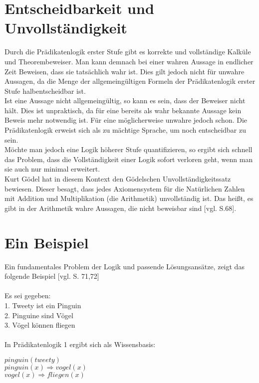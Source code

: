 \section{Entscheidbarkeit und Unvollständigkeit}
Durch die Prädikatenlogik erster Stufe gibt es korrekte und vollständige
Kalküle und Theorembeweiser. Man kann demnach bei einer wahren Aussage in endlicher Zeit Beweisen, dass sie tatsächlich wahr ist. Dies gilt jedoch nicht für unwahre Aussagen, da die Menge der allgemeingültigen Formeln der Prädikatenlogik erster Stufe halbentscheidbar ist.\\
Ist eine Aussage nicht allgemeingültig, so kann es sein, dass der Beweiser nicht hält. Dies ist unpraktisch, da für eine bereits als wahr bekannte Aussage kein Beweis mehr notwendig ist. Für eine möglicherweise unwahre jedoch schon.
Die Prädikatenlogik erweist sich als zu mächtige Sprache, um noch entscheidbar zu sein. \\
Möchte man jedoch eine Logik höherer Stufe quantifizieren, so ergibt sich schnell das Problem, dass die Vollständigkeit einer Logik sofort verloren geht, wenn man sie auch nur minimal erweitert.\\
Kurt Gödel hat in diesem Kontext den Gödelschen Unvollständigkeitssatz bewiesen. Dieser besagt, dass jedes Axiomensystem für die Natürlichen Zahlen mit Addition und Multiplikation (die Arithmetik) unvollständig ist. Das heißt, es gibt in der Arithmetik wahre Aussagen, die nicht beweisbar sind [vgl. S.68].

\section{Ein Beispiel}
Ein fundamentales Problem der Logik und passende Lösungsansätze, zeigt das folgende Beispiel [vgl. S. 71,72]
\\
\\
Es sei gegeben:\\
1. Tweety ist ein Pinguin\\
2. Pinguine sind Vögel\\
3. Vögel können fliegen\\\\

In Prädikatenlogik 1 ergibt sich als Wissensbasis:


$pinguin(tweety)$\\
$pinguin(x) \Rightarrow vogel(x)$\\
$vogel(x) \Rightarrow fliegen(x)$\\


